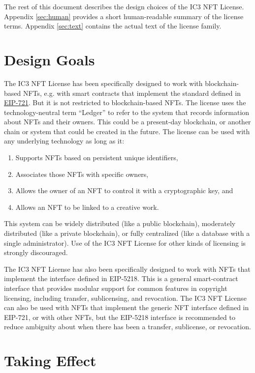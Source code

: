 \documentclass{article}
\newcommand{\eiplicense}{EIP-5218\xspace}
\newcommand{\iccclicense}{IC3 NFT License\xspace}
\begin{document}
The rest of this document describes the design choices of the \iccclicense. Appendix \ref{sec:human} provides a short human-readable summary of the license terms. Appendix \ref{sec:text} contains the actual text of the license family.


\section{Design Goals}


The \iccclicense has been specifically designed to work with blockchain-based NFTs, e.g. with smart contracts that implement the standard defined in \href{https://eips.ethereum.org/EIPS/eip-721}{EIP-721}. But it is not restricted to blockchain-based NFTs. The license uses the technology-neutral term ``Ledger'' to refer to the system that records information about NFTs and their owners. This could be a present-day blockchain, or another chain or system that could be created in the future. The license can be used with any underlying technology as long as it:
\begin{enumerate}
\item Supports NFTs based on persistent unique identifiers, 
\item Associates those NFTs with specific owners,
\item Allows the owner of an NFT to control it with a cryptographic key, and 
\item Allows an NFT to be linked to a creative work. 
\end{enumerate}
This system can be widely distributed (like a public blockchain), moderately distributed (like a private blockchain), or fully centralized (like a database with a single administrator). Use of the \iccclicense for other kinds of licensing is strongly discouraged.

The \iccclicense has also been specifically designed to work with NFTs that implement the interface defined in \eiplicense. This is a general smart-contract interface that provides modular support for common features in copyright licensing, including transfer, sublicensing, and revocation. The \iccclicense can also be used with NFTs that implement the generic NFT interface defined in EIP-721, or with other NFTs, but the \eiplicense interface is recommended to reduce ambiguity about when there has been a transfer, sublicense, or revocation.


\section{Taking Effect}
\end{document}
